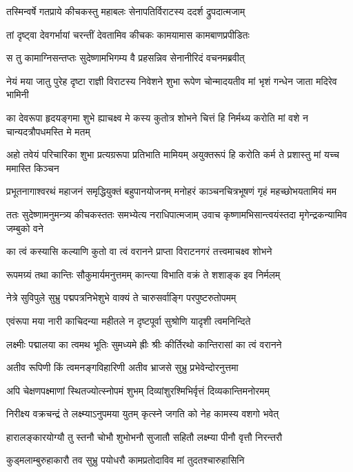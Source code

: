 \twolineshloka
{तस्मिन्वर्षे गतप्राये कीचकस्तु महाबलः}
{सेनापतिर्विराटस्य ददर्श द्रुपदात्मजाम्}


\twolineshloka
{तां दृष्ट्वा देवगर्भायां चरन्तीं देवतामिव}
{कीचकः कामयामास कामबाणप्रपीडितः}


\twolineshloka
{स तु कामाग्निसन्तप्तः सुदेष्णामभिगम्य वै}
{प्रहसन्निव सेनानीरिदं वचनमब्रवीत्}


\twolineshloka
{नेयं मया जातु पुरेह दृष्टा राज्ञी विराटस्य निवेशने शुभा}
{रूपेण चोन्मादयतीव मां भृशं गन्धेन जाता मदिरेव भामिनी}


\twolineshloka
{का देवरूपा हृदयङ्गमा शुभे ह्याचक्ष्व मे कस्य कुतोत्र शोभने}
{चित्तं हि निर्मथ्य करोति मां वशे न चान्यदत्रौपधमस्ति मे मतम्}


\twolineshloka
{अहो तवेयं परिचारिका शुभा प्रत्यग्ररूपा प्रतिभाति मामियम्}
{अयुक्तरूपं हि करोति कर्म ते प्रशास्तु मां यच्च ममास्ति किञ्चन}


\twolineshloka
{प्रभूतनागाश्वरथं महाजनं समृद्धियुक्तं बहुपानयोजनम्}
{मनोहरं काञ्चनचित्रभूषणं गृहं महच्छोभयतामियं मम}


\twolineshloka
{ततः सुदेष्णामनुमन्त्र्य कीचकस्ततः समभ्येत्य नराधिपात्मजाम्}
{उवाच कृष्णामभिसान्त्वयंस्तदा मृगेन्द्रकन्यामिव जम्बुको वने}


\twolineshloka
{का त्वं कस्यासि कल्याणि कुतो वा त्वं वरानने}
{प्राप्ता विराटनगरं तत्त्वमाचक्ष्व शोभने}


\twolineshloka
{रूपमग्र्यं तथा कान्तिः सौकुमार्यमनुत्तमम्}
{कान्त्या विभाति वक्रं ते शशाङ्क इव निर्मलम्}


\twolineshloka
{नेत्रे सुविपुले सुभ्रु पद्मपत्रनिभेशुभे}
{वाक्यं ते चारुसर्वाङ्गि परपुष्टरुतोपमम्}


\twolineshloka
{एवंरूपा मया नारी काचिदन्या महीतले}
{न दृष्टपूर्वा सुश्रोणि यादृशी त्वमनिन्दिते}


\twolineshloka
{लक्ष्मीः पद्मालया का त्वमथ भूतिः सुमध्यमे}
{ह्रीः श्रीः कीर्तिरथो कान्तिरासां का त्वं वरानने}


\twolineshloka
{अतीव रूपिणी किं त्वमनङ्गविहारिणी}
{अतीव भ्राजसे सुभ्रु प्रभेवेन्दोरनुत्तमा}


\twolineshloka
{अपि चेक्षणपक्ष्माणां स्थितज्योत्स्नोपमं शुभम्}
{दिव्यांशुरश्मिभिर्वृत्तं दिव्यकान्तिमनोरमम्}


\twolineshloka
{निरीक्ष्य वक्रचन्द्रं ते लक्ष्म्याऽनुपमया युतम्}
{कृत्स्ने जगति को नेह कामस्य वशगो भवेत्}


\twolineshloka
{हारालङ्कारयोग्यौ तु स्तनौ चोभौ शुभोभनौ}
{सुजातौ सहितौ लक्ष्म्या पीनौ वृत्तौ निरन्तरौ}


\twolineshloka
{कुड्मलाम्बुरुहाकारौ तव सुभ्रु पयोधरौ}
{कामप्रतोदाविव मां तुदतश्चारुहासिनि}


